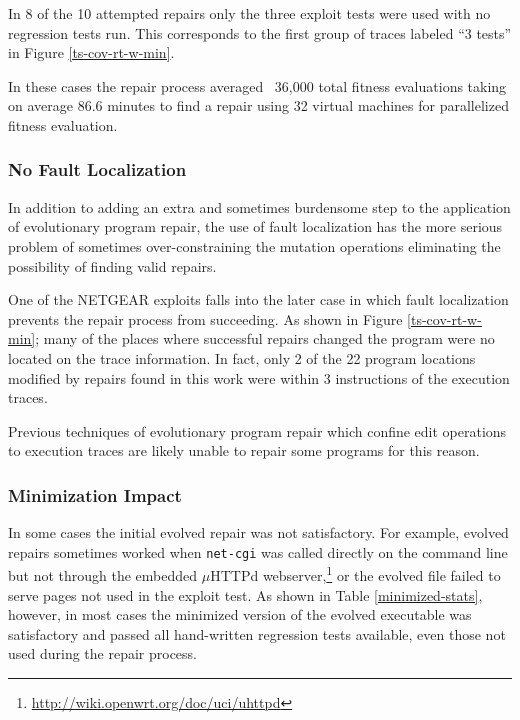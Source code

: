 \documentclass{sigcomm-alternate}
\begin{document}
{In 8 of the 10 attempted repairs only the three exploit tests were
used with no regression tests run.  This corresponds to the first
group of traces labeled ``3 tests'' in Figure \ref{ts-cov-rt-w-min}.

In these cases the repair process averaged ~36,000 total fitness
evaluations taking on average 86.6 minutes to find a repair using 32
virtual machines for parallelized fitness evaluation.

\subsubsection{No Fault Localization}
\label{no-fault-localization}

In addition to adding an extra and sometimes burdensome step to the
application of evolutionary program repair, the use of fault
localization has the more serious problem of sometimes
over-constraining the mutation operations eliminating the possibility
of finding valid repairs.

One of the NETGEAR exploits falls into the later case in which fault
localization prevents the repair process from succeeding.  As shown in
Figure \ref{ts-cov-rt-w-min}; many of the places where successful
repairs changed the program were no located on the trace information.
In fact, only 2 of the 22 program locations modified by repairs found
in this work were within 3 instructions of the execution traces.

Previous techniques of evolutionary program repair which confine edit
operations to execution traces are likely unable to repair some
programs for this reason.

\subsubsection{Minimization Impact}
\label{minimization}

In some cases the initial evolved repair was not satisfactory.  For
example, evolved repairs sometimes worked when \texttt{net-cgi} was
called directly on the command line but not through the embedded
$\mu$HTTPd webserver,\footnote{\url{http://wiki.openwrt.org/doc/uci/uhttpd}}
or the evolved file failed to serve pages not used in the
exploit test.  As shown in Table \ref{minimized-stats}, however, in most
cases the minimized version of the evolved executable was satisfactory
and passed all hand-written regression tests available, even those not used
during the repair process. 

}
\end{document}
